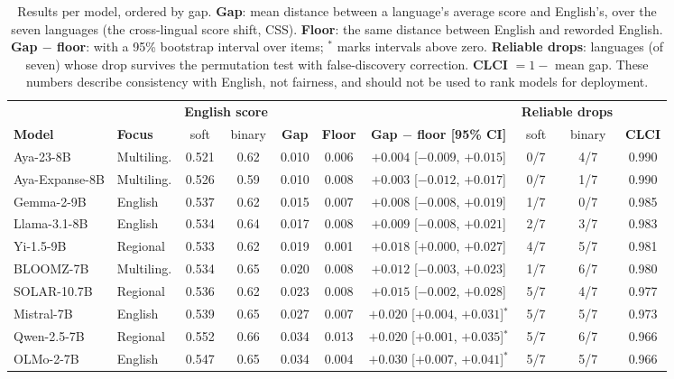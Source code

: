 \begin{table}[t]
\centering
\small
\setlength{\tabcolsep}{5pt}
\begin{tabular}{llcccccccc}
\toprule
 & & \multicolumn{2}{c}{\textbf{English score}} & & & & \multicolumn{2}{c}{\textbf{Reliable drops}} & \\
\cmidrule(lr){3-4}\cmidrule(lr){8-9}
\textbf{Model} & \textbf{Focus} & soft & binary & \textbf{Gap} & \textbf{Floor} & \textbf{Gap $-$ floor [95\% CI]} & soft & binary & \textbf{CLCI} \\
\midrule
Aya-23-8B & Multiling. & 0.521 & 0.62 & 0.010 & 0.006 & $+0.004$ [$-0.009$, $+0.015$] & 0/7 & 4/7 & 0.990 \\
Aya-Expanse-8B & Multiling. & 0.526 & 0.59 & 0.010 & 0.008 & $+0.003$ [$-0.012$, $+0.017$] & 0/7 & 1/7 & 0.990 \\
Gemma-2-9B & English & 0.537 & 0.62 & 0.015 & 0.007 & $+0.008$ [$-0.008$, $+0.019$] & 1/7 & 0/7 & 0.985 \\
Llama-3.1-8B & English & 0.534 & 0.64 & 0.017 & 0.008 & $+0.009$ [$-0.008$, $+0.021$] & 2/7 & 3/7 & 0.983 \\
Yi-1.5-9B & Regional & 0.533 & 0.62 & 0.019 & 0.001 & $+0.018$ [$+0.000$, $+0.027$] & 4/7 & 5/7 & 0.981 \\
BLOOMZ-7B & Multiling. & 0.534 & 0.65 & 0.020 & 0.008 & $+0.012$ [$-0.003$, $+0.023$] & 1/7 & 6/7 & 0.980 \\
SOLAR-10.7B & Regional & 0.536 & 0.62 & 0.023 & 0.008 & $+0.015$ [$-0.002$, $+0.028$] & 5/7 & 4/7 & 0.977 \\
Mistral-7B & English & 0.539 & 0.65 & 0.027 & 0.007 & $+0.020$ [$+0.004$, $+0.031$]$^{\ast}$ & 5/7 & 5/7 & 0.973 \\
Qwen-2.5-7B & Regional & 0.552 & 0.66 & 0.034 & 0.013 & $+0.020$ [$+0.001$, $+0.035$]$^{\ast}$ & 5/7 & 6/7 & 0.966 \\
OLMo-2-7B & English & 0.547 & 0.65 & 0.034 & 0.004 & $+0.030$ [$+0.007$, $+0.041$]$^{\ast}$ & 5/7 & 5/7 & 0.966 \\
\bottomrule
\end{tabular}
\caption{Results per model, ordered by gap. \textbf{Gap}: mean distance between a language's average score and English's, over the seven languages (the cross-lingual score shift, CSS). \textbf{Floor}: the same distance between English and reworded English. \textbf{Gap $-$ floor}: with a 95\% bootstrap interval over items; $^{\ast}$ marks intervals above zero. \textbf{Reliable drops}: languages (of seven) whose drop survives the permutation test with false-discovery correction. \textbf{CLCI} $= 1 - $ mean gap. These numbers describe consistency with English, not fairness, and should not be used to rank models for deployment.}
\label{tab:models}
\end{table}
